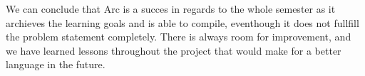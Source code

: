 
We can conclude that Arc is a succes in regards to the whole semester as it archieves the learning goals and is able to compile, eventhough it does not fullfill the problem statement completely. There is always room for improvement, and we have learned lessons throughout the project that would make for a better language in the future. 